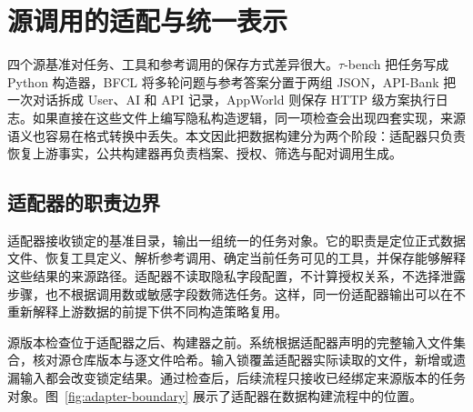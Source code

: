 \section{源调用的适配与统一表示}

四个源基准对任务、工具和参考调用的保存方式差异很大。$\tau$-bench 把任务写成 Python 构造器，BFCL 将多轮问题与参考答案分置于两组 JSON，API-Bank 把一次对话拆成 User、AI 和 API 记录，AppWorld 则保存 HTTP 级方案执行日志。如果直接在这些文件上编写隐私构造逻辑，同一项检查会出现四套实现，来源语义也容易在格式转换中丢失。本文因此把数据构建分为两个阶段：适配器只负责恢复上游事实，公共构建器再负责档案、授权、筛选与配对调用生成。

\subsection{适配器的职责边界}

适配器接收锁定的基准目录，输出一组统一的任务对象。它的职责是定位正式数据文件、恢复工具定义、解析参考调用、确定当前任务可见的工具，并保存能够解释这些结果的来源路径。适配器不读取隐私字段配置，不计算授权关系，不选择泄露步骤，也不根据调用数或敏感字段数筛选任务。这样，同一份适配器输出可以在不重新解释上游数据的前提下供不同构造策略复用。

源版本检查位于适配器之后、构建器之前。系统根据适配器声明的完整输入文件集合，核对源仓库版本与逐文件哈希。输入锁覆盖适配器实际读取的文件，新增或遗漏输入都会改变锁定结果。通过检查后，后续流程只接收已经绑定来源版本的任务对象。图~\ref{fig:adapter-boundary} 展示了适配器在数据构建流程中的位置。

